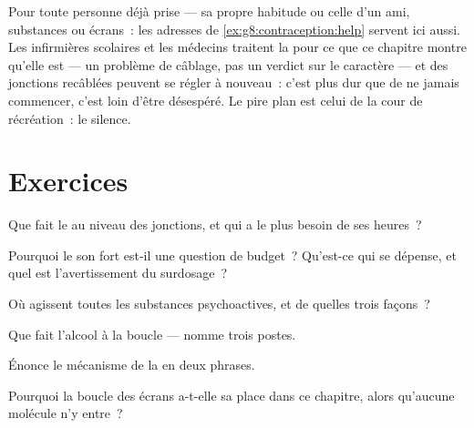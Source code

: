 \begin{example}\label{ex:g8:protecting-the-nervous-system:help}
Pour toute personne déjà prise --- sa propre habitude ou
celle d'un ami, substances ou écrans~: les adresses de
\cref{ex:g8:contraception:help} servent ici aussi. Les
infirmières scolaires et les médecins traitent la
 pour ce que ce chapitre montre qu'elle est ---
un problème de câblage, pas un verdict sur le caractère ---
et des jonctions recâblées peuvent se régler à nouveau~:
c'est plus dur que de ne jamais commencer, c'est loin
d'être désespéré. Le pire plan est celui de la cour de
récréation~: le silence.
\end{example}

\section{Exercices}

\begin{exercise}[$\star$]\label{exo:g8:protecting-the-nervous-system:1}
Que fait le  au niveau des jonctions, et qui a le
plus besoin de ses heures~?
\end{exercise}

\begin{exercise}[$\star$]\label{exo:g8:protecting-the-nervous-system:2}
Pourquoi le son fort est-il une question de budget~?
Qu'est-ce qui se dépense, et quel est l'avertissement du
surdosage~?
\end{exercise}

\begin{exercise}[$\star$]\label{exo:g8:protecting-the-nervous-system:3}
Où agissent toutes les substances psychoactives, et de
quelles trois façons~?
\end{exercise}

\begin{exercise}[$\star$]\label{exo:g8:protecting-the-nervous-system:4}
Que fait l'alcool à la boucle --- nomme trois postes.
\end{exercise}

\begin{exercise}[$\star$]\label{exo:g8:protecting-the-nervous-system:5}
Énonce le mécanisme de la  en deux phrases.
\end{exercise}

\begin{exercise}[$\star$]\label{exo:g8:protecting-the-nervous-system:6}
Pourquoi la boucle des écrans a-t-elle sa place dans ce
chapitre, alors qu'aucune molécule n'y entre~?
\end{exercise}

